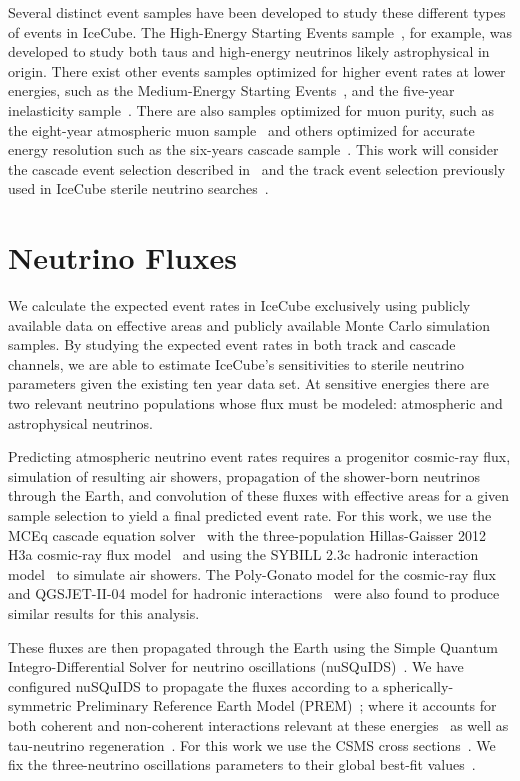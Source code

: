 \documentclass[main.tex]{subfiles}
\begin{document}
Several distinct event samples have been developed to study these different types of events in IceCube. The High-Energy Starting Events sample~\cite{2021hese}, for example, was developed to study both taus and high-energy neutrinos likely astrophysical in origin. There exist other events samples optimized for higher event rates at lower energies, such as the Medium-Energy Starting Events~\cite{PhysRevDoverone}, and the five-year inelasticity sample~\cite{inelasticity2019}. There are also samples optimized for muon purity, such as the eight-year atmospheric muon sample~\cite{Aartsen_2020_prd} and others optimized for accurate energy resolution such as the six-years cascade sample~\cite{sixyrscascade}. This work will consider the cascade event selection described in~\cite{2018PhDT17N} and the track event selection previously used in IceCube sterile neutrino searches~\cite{PhysRevLett.117.071801}.

\section{\label{sec:flux} Neutrino Fluxes}

We calculate the expected event rates in IceCube exclusively using publicly available data on effective areas and publicly available Monte Carlo simulation samples. By studying the expected event rates in both track and cascade channels, we are able to estimate IceCube's sensitivities to sterile neutrino parameters given the existing ten year data set. 
At sensitive energies there are two relevant neutrino populations whose flux must be modeled: atmospheric and astrophysical neutrinos. 

Predicting atmospheric neutrino event rates requires a progenitor cosmic-ray flux, simulation of resulting air showers, propagation of the shower-born neutrinos through the Earth, and convolution of these fluxes with effective areas for a given sample selection to yield a final predicted event rate. 
For this work, we use the MCEq cascade equation solver~\cite{fedynitch2015calculation} with the three-population Hillas-Gaisser 2012 H3a cosmic-ray flux model~\cite{GAISSER2012801} and using the SYBILL 2.3c hadronic interaction model~\cite{Riehn:2017mfm} to simulate air showers.
The Poly-Gonato model for the cosmic-ray flux~\cite{polygonato2003} and QGSJET-II-04 model for hadronic interactions~\cite{qgsjet2011} were also found to produce similar results for this analysis. 

These fluxes are then propagated through the Earth using the Simple Quantum Integro-Differential Solver for neutrino oscillations (nuSQuIDS)~\cite{Arguelles:2020hss,arguelles:2015nu,arguelles2021nusquids}. 
We have configured nuSQuIDS to propagate the fluxes according to a spherically-symmetric Preliminary Reference Earth Model (PREM)~\cite{DZIEWONSKI1981297}; where it accounts for both coherent and non-coherent interactions relevant at these energies~\cite{Gonzalez_Garcia_2005, PhysRev.118.316} as well as tau-neutrino regeneration~\cite{PhysRevLett.81.4305}. 
For this work we use the CSMS cross sections~\cite{CooperSarkar:2011pa}. We fix the three-neutrino oscillations parameters to their global best-fit values~\cite{nufit2020}.
\end{document}
